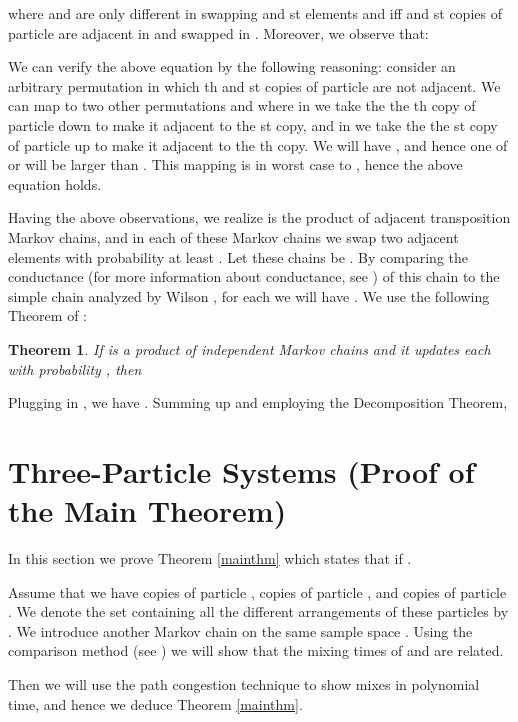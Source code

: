 \documentclass[10 pt]{article}
\newtheorem{thm}{Theorem}[section]
\begin{document}
where   and  are only different in swapping   and st elements and
 iff  and st copies of particle  are adjacent in  and swapped in . 
Moreover, we observe that:
 
We can verify the above equation by the following reasoning: consider an arbitrary permutation
 in which th and st copies of particle  are not adjacent.
We can map  to two other permutations  and  where in  we take the the th copy of particle  down to make it
adjacent to the st copy, and in   we take the the st copy of particle  up to make it adjacent to the th copy.
We will have , and hence one of  or  will be larger than .
This mapping is in worst case  to , hence the above equation holds.  

Having the above observations, we realize  is the product of  adjacent transposition Markov chains, and in each of these
Markov chains we swap two adjacent elements with probability at least . Let these chains be .
By comparing the conductance (for more information about conductance, see \cite{MCBook}) of this chain to the simple chain analyzed
by Wilson \cite{Wilson}, for each  we will have . 
We use the following Theorem of \cite{Dana}:

\begin{thm}\label{product}
If   is a product of  independent Markov chains 
and it updates each   with probability , then

\end{thm}

Plugging in , we have . Summing up and employing the Decomposition Theorem,



\section{ Three-Particle Systems (Proof of the Main Theorem)}\label{proof}

In this section we prove Theorem \ref{mainthm} which states that  if 
.

Assume that we have  copies of particle ,  copies of particle , and  copies of particle .
We denote the set containing all the different arrangements of these particles by .
We introduce another Markov chain  on the same sample space .
Using the comparison method (see \cite{compare}) we will show that the mixing times of  and  are related.

Then we will use the path congestion technique to show  mixes in polynomial time, and hence we deduce Theorem \ref{mainthm}.
\end{document}
